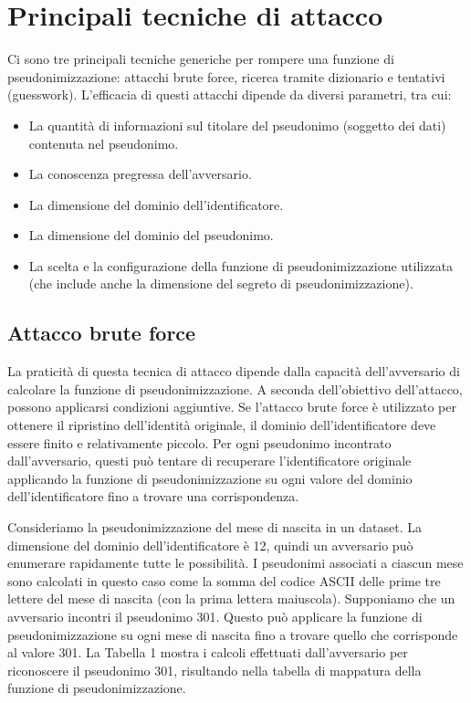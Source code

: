 \chapter{Principali tecniche di attacco}

Ci sono tre principali tecniche generiche per rompere una funzione di pseudonimizzazione: attacchi brute force, ricerca tramite dizionario e tentativi (guesswork). L'efficacia di questi attacchi dipende da diversi parametri, tra cui:
\begin{itemize}
  \item La quantità di informazioni sul titolare del pseudonimo (soggetto dei dati) contenuta nel pseudonimo.
  \item La conoscenza pregressa dell'avversario.
  \item La dimensione del dominio dell'identificatore.
  \item La dimensione del dominio del pseudonimo.
  \item La scelta e la configurazione della funzione di pseudonimizzazione utilizzata (che include anche la 
  dimensione del segreto di pseudonimizzazione).
\end{itemize}

\section{Attacco brute force}

La praticità di questa tecnica di attacco dipende dalla capacità dell'avversario di calcolare la funzione di pseudonimizzazione. 
A seconda dell'obiettivo dell'attacco, possono applicarsi condizioni aggiuntive. Se l'attacco brute force è utilizzato per ottenere il ripristino dell'identità originale, il dominio dell'identificatore deve essere finito e relativamente piccolo. Per ogni pseudonimo incontrato dall'avversario, questi può tentare di recuperare l'identificatore originale applicando la funzione di pseudonimizzazione su ogni valore del dominio dell'identificatore fino a trovare una corrispondenza.

Consideriamo la pseudonimizzazione del mese di nascita in un dataset. La dimensione del dominio dell'identificatore è 12, quindi un avversario può enumerare rapidamente tutte le possibilità. I pseudonimi associati a ciascun mese sono calcolati in questo caso come la somma del codice ASCII delle prime tre lettere del mese di nascita (con la prima lettera maiuscola). Supponiamo che un avversario incontri il pseudonimo 301. Questo può applicare la funzione di pseudonimizzazione su ogni mese di nascita fino a trovare quello che corrisponde al valore 301. La Tabella 1 mostra i calcoli effettuati dall'avversario per riconoscere il pseudonimo 301, risultando nella tabella di mappatura della funzione di pseudonimizzazione.

